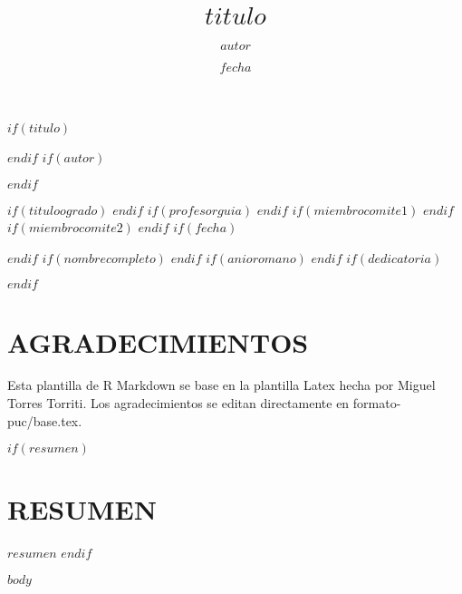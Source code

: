 \documentclass[12pt,reqno,oneside,pdftex]{formato-puc/puctesis} %
\begin{document}
$if(titulo)$
\title{$titulo$}
$endif$
$if(autor)$
\author{$autor$}
$endif$

$if(tituloogrado)$
$endif$
$if(profesorguia)$
$endif$
$if(miembrocomite1)$
$endif$
$if(miembrocomite2)$
$endif$
$if(fecha)$
\date         {$fecha$}
$endif$
$if(nombrecompleto)$
$endif$
$if(anioromano)$
$endif$
$if(dedicatoria)$
\dedication   {$dedicatoria$}
$endif$

\PageNumbersFootCentered
{}
\maketitle

\chapter*{AGRADECIMIENTOS}
Esta plantilla de R Markdown se base en la plantilla Latex hecha por
Miguel Torres Torriti. Los agradecimientos se editan directamente en formato-puc/base.tex.
\par

\cleardoublepage
\tableofcontents
\listoffigures          
\listoftables           
\cleardoublepage

$if(resumen)$
\chapter*{RESUMEN}
$resumen$
$endif$

\cleardoublepage %

\NoChapterPageNumber           %

$body$
\end{document}

